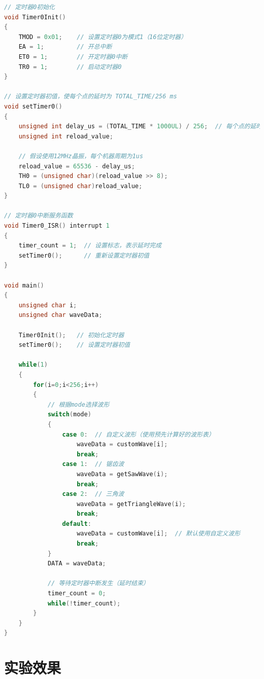 \documentclass[12pt,hyperref,a4paper,UTF8]{ctexart}
\begin{document}
\begin{lstlisting}[language=C, caption={实验程序}]
// 定时器0初始化
void Timer0Init()
{
    TMOD = 0x01;    // 设置定时器0为模式1（16位定时器）
    EA = 1;         // 开总中断
    ET0 = 1;        // 开定时器0中断
    TR0 = 1;        // 启动定时器0
}

// 设置定时器初值，使每个点的延时为 TOTAL_TIME/256 ms
void setTimer0()
{
    unsigned int delay_us = (TOTAL_TIME * 1000UL) / 256;  // 每个点的延时（微秒）
    unsigned int reload_value;
    
    // 假设使用12MHz晶振，每个机器周期为1us
    reload_value = 65536 - delay_us;
    TH0 = (unsigned char)(reload_value >> 8);
    TL0 = (unsigned char)reload_value;
}

// 定时器0中断服务函数
void Timer0_ISR() interrupt 1
{
    timer_count = 1;  // 设置标志，表示延时完成
    setTimer0();      // 重新设置定时器初值
}
 
void main()
{
    unsigned char i;
    unsigned char waveData;
    
    Timer0Init();   // 初始化定时器
    setTimer0();    // 设置定时器初值
    
    while(1)
    {
        for(i=0;i<256;i++)
        {
            // 根据mode选择波形
            switch(mode)
            {
                case 0:  // 自定义波形（使用预先计算好的波形表）
                    waveData = customWave[i];
                    break;
                case 1:  // 锯齿波
                    waveData = getSawWave(i);
                    break;
                case 2:  // 三角波
                    waveData = getTriangleWave(i);
                    break;
                default:
                    waveData = customWave[i];  // 默认使用自定义波形
                    break;
            }
            DATA = waveData;
            
            // 等待定时器中断发生（延时结束）
            timer_count = 0;
            while(!timer_count); 
        }
    }
}

\end{lstlisting}

\section{实验效果}
\end{document}
